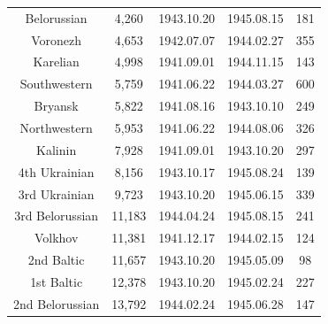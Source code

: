\begin{table}[ht]
\begin{tabular}{p{2.5cm}p{3.5cm}p{1.75cm}p{1.75cm}p{1.75cm}}
  \multicolumn{1}{c}{Belorussian} & \multicolumn{1}{c}{ 4,260} & \multicolumn{1}{c}{1943.10.20} & \multicolumn{1}{c}{1945.08.15} & \multicolumn{1}{c}{181} \\ 
  \multicolumn{1}{c}{Voronezh} & \multicolumn{1}{c}{ 4,653} & \multicolumn{1}{c}{1942.07.07} & \multicolumn{1}{c}{1944.02.27} & \multicolumn{1}{c}{355} \\ 
  \multicolumn{1}{c}{Karelian} & \multicolumn{1}{c}{ 4,998} & \multicolumn{1}{c}{1941.09.01} & \multicolumn{1}{c}{1944.11.15} & \multicolumn{1}{c}{143} \\ 
  \multicolumn{1}{c}{Southwestern} & \multicolumn{1}{c}{ 5,759} & \multicolumn{1}{c}{1941.06.22} & \multicolumn{1}{c}{1944.03.27} & \multicolumn{1}{c}{600} \\ 
  \multicolumn{1}{c}{Bryansk} & \multicolumn{1}{c}{ 5,822} & \multicolumn{1}{c}{1941.08.16} & \multicolumn{1}{c}{1943.10.10} & \multicolumn{1}{c}{249} \\ 
  \multicolumn{1}{c}{Northwestern} & \multicolumn{1}{c}{ 5,953} & \multicolumn{1}{c}{1941.06.22} & \multicolumn{1}{c}{1944.08.06} & \multicolumn{1}{c}{326} \\ 
  \multicolumn{1}{c}{Kalinin} & \multicolumn{1}{c}{ 7,928} & \multicolumn{1}{c}{1941.09.01} & \multicolumn{1}{c}{1943.10.20} & \multicolumn{1}{c}{297} \\ 
  \multicolumn{1}{c}{4th Ukrainian} & \multicolumn{1}{c}{ 8,156} & \multicolumn{1}{c}{1943.10.17} & \multicolumn{1}{c}{1945.08.24} & \multicolumn{1}{c}{139} \\ 
  \multicolumn{1}{c}{3rd Ukrainian} & \multicolumn{1}{c}{ 9,723} & \multicolumn{1}{c}{1943.10.20} & \multicolumn{1}{c}{1945.06.15} & \multicolumn{1}{c}{339} \\ 
  \multicolumn{1}{c}{3rd Belorussian} & \multicolumn{1}{c}{11,183} & \multicolumn{1}{c}{1944.04.24} & \multicolumn{1}{c}{1945.08.15} & \multicolumn{1}{c}{241} \\ 
  \multicolumn{1}{c}{Volkhov} & \multicolumn{1}{c}{11,381} & \multicolumn{1}{c}{1941.12.17} & \multicolumn{1}{c}{1944.02.15} & \multicolumn{1}{c}{124} \\ 
  \multicolumn{1}{c}{2nd Baltic} & \multicolumn{1}{c}{11,657} & \multicolumn{1}{c}{1943.10.20} & \multicolumn{1}{c}{1945.05.09} & \multicolumn{1}{c}{98} \\ 
  \multicolumn{1}{c}{1st Baltic} & \multicolumn{1}{c}{12,378} & \multicolumn{1}{c}{1943.10.20} & \multicolumn{1}{c}{1945.02.24} & \multicolumn{1}{c}{227} \\ 
  \multicolumn{1}{c}{2nd Belorussian} & \multicolumn{1}{c}{13,792} & \multicolumn{1}{c}{1944.02.24} & \multicolumn{1}{c}{1945.06.28} & \multicolumn{1}{c}{147} \\ 

\end{tabular}
\end{table}
